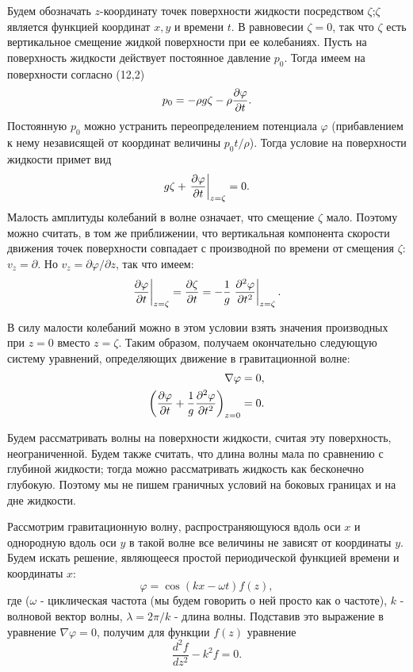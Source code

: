 Будем обозначать $z$-координату точек поверхности жидкости посредством
$\zeta$;$\zeta$ является функцией координат $x,y$ и времени $t$. В равновесии
$\zeta=0$, так что $\zeta$ есть вертикальное смещение жидкой поверхности при ее
колебаниях. Пусть на поверхность жидкости действует постоянное давление $p_0$.
Тогда имеем на поверхности согласно (12,2)
\[
   p_0 = - \rho g \zeta - \rho \frac{\partial{\varphi}}{\partial{t}}.
\]
Постоянную $p_0$ можно устранить переопределением потенциала $\varphi$
(прибавлением к нему независящей от координат величины $p_0t/\rho$). Тогда
условие на поверхности жидкости примет вид
\begin{equation}
 \label{eq:12.3}
       g \zeta + \left.\frac{\partial{\varphi}}{\partial{t}}\right\vert_{z=\zeta} = 0.
\end{equation}
Малость амплитуды колебаний в волне означает, что смещение $\zeta$ мало. Поэтому
можно считать, в том же приближении, что вертикальная компонента скорости
движения точек поверхности совпадает с производной по времени от смещения
$\zeta$: $v_z=\partial$. Но $v_z=\partial\varphi/\partial z$, так что имеем:
\[
   \left.\frac{\partial{\varphi}}{\partial{t}}\right\vert_{z=\zeta} = \frac{\partial{\zeta}}{\partial{t}} = - \frac1{g}
   \left.\frac{\partial^2\varphi}{\partial t^2}\right\vert_{z=\zeta}.
\]

В силу малости колебаний можно в этом условии взять значения производных при
$z=0$ вместо $z=\zeta$. Таким образом, получаем окончательно следующую систему
уравнений, определяющих движение в гравитационной волне:
\begin{eqnarray}
 \label{eq:12.4}
   \nabla\varphi = 0, \\
 \label{eq:12.5}
   \left( \frac{\partial{\varphi}}{\partial{t}} +
   \frac1{g} \frac{\partial^2 \varphi}{\partial t^2} \right)_{z=0} = 0.
\end{eqnarray}

Будем рассматривать волны на поверхности жидкости, считая эту поверхность,
неограниченной. Будем также считать, что длина волны мала по сравнению с
глубиной жидкости; тогда можно рассматривать жидкость как бесконечно глубокую.
Поэтому мы не пишем граничных условий на боковых границах и на дне жидкости.

Рассмотрим гравитационную волну, распространяющуюся вдоль оси $x$ и однородную
вдоль оси $y$ в такой волне все величины не зависят от координаты $y$. Будем
искать решение, являющееся простой периодической функцией времени и координаты
$x$:
\[
   \varphi = \cos (kx - \omega t)f(z),
\]
где ($\omega$ - циклическая частота (мы будем говорить о ней просто как о
частоте), $k$ - волновой вектор волны, $\lambda = 2\pi/k$ - длина волны.
Подставив это выражение в уравнение $\nabla\varphi = 0$, получим для функции
$f(z)$ уравнение
\[
   \frac{d^2f}{dz^2} - k^2f = 0.
\]

